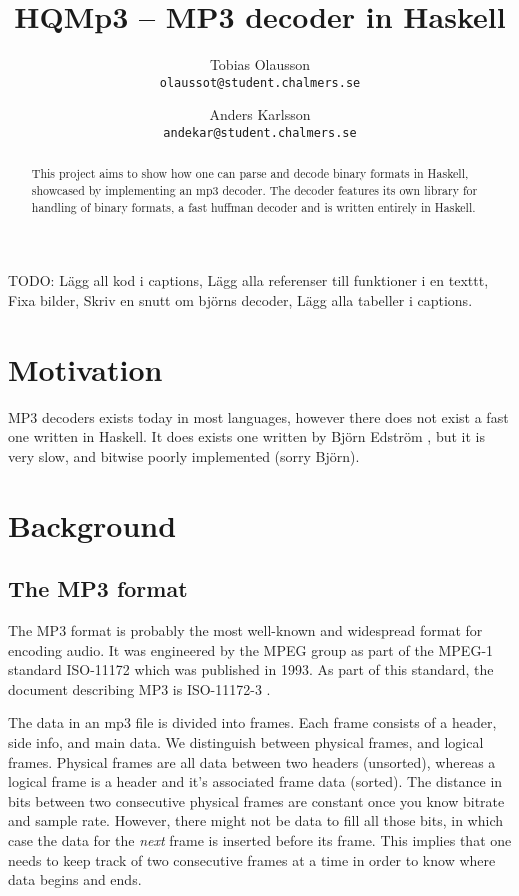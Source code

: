 \documentclass[a4paper,12pt]{article}
\title{HQMp3 -- MP3 decoder in Haskell}
\author{Tobias Olausson \\ \texttt{\small{olaussot@student.chalmers.se}} \and 
        Anders Karlsson \\ \texttt{\small{andekar@student.chalmers.se}}
}
\date{ \rule{0.8 \linewidth}{0.5mm} \\[3mm]
       University of Gothenburg \\ 
       \small{\today}
}
\begin{document}
\maketitle

\begin{abstract}
    This project aims to show how one can parse and decode binary formats in
    Haskell, showcased by implementing an mp3 decoder. The decoder features its
    own library for handling of binary formats, a fast huffman decoder and is
    written entirely in Haskell.
\end{abstract}

\tableofcontents


TODO: Lägg all kod i captions,
      Lägg alla referenser till funktioner i en texttt,
      Fixa bilder,
      Skriv en snutt om björns decoder,
      Lägg alla tabeller i captions.

\section{Motivation}
    MP3 decoders exists today in most languages, however there does not exist
    a fast one written in Haskell. It does exists one written by Björn Edström
    \cite{bjorn}, but it is very slow, and bitwise poorly implemented (sorry
    Björn).

\section{Background}
    \subsection{The MP3 format}
       The MP3 format is probably the most well-known and widespread format for
       encoding audio. It was engineered by the MPEG group as part of the MPEG-1
       standard ISO-11172 which was published in 1993. As part of this standard,
       the document describing MP3 is ISO-11172-3 \cite{wikimp3,wikimpeg1}.

       The data in an mp3 file is divided into frames. Each frame consists of
       a header, side info, and main data. We distinguish between physical
       frames, and logical frames. Physical frames are all data between two
       headers (unsorted), whereas a logical frame is a header and it's
       associated frame data (sorted). The distance in bits between two
       consecutive physical frames are constant once you know bitrate and sample
       rate. However, there might not be data to fill all those bits, in which
       case the data for the \textit{next} frame is inserted before its frame.
       This implies that one needs to keep track of two consecutive frames at a 
       time in order to know where data begins and ends.
\end{document}
